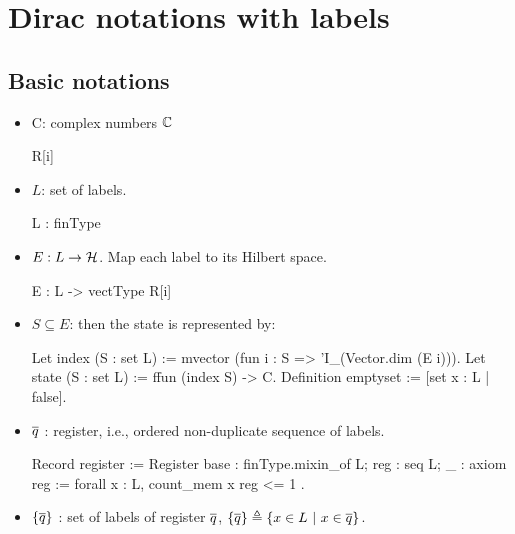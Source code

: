 \section{Dirac notations with labels}

    \subsection{Basic notations}
    \begin{itemize}
        \item C: complex numbers ${\mathbb{C}}$
        \begin{coq}
        R[i]
        \end{coq}
        \vspace{-.7cm}
        \item $L$: set of labels. 
        \begin{coq}
        L : finType
        \end{coq}
        \vspace{-.7cm}
        \item $E : L \rightarrow {\mathcal{H}}$. Map each label to its Hilbert space.
        \begin{coq}
        E : L -> vectType R[i]
        \end{coq}
        \vspace{-.7cm}
        \item $S\subseteq E$: then the state is represented by: 
        \begin{coq}
        Let index (S : {set L}) := mvector (fun i : S => 'I\_(Vector.dim (E i))).
        Let state (S : {set L}) := {ffun (index S) -> C}.
        Definition emptyset := [set x : L | false].
        \end{coq}
        \vspace{-.7cm}
        \item ${\overline{q}}$ : register, i.e., ordered non-duplicate sequence of labels.
        \begin{coq}
        Record register := Register {
            base : finType.mixin_of L;
            reg : seq L;
            _ : axiom reg := forall x : L, count_mem x reg <= 1
        }.
        \end{coq}
        \vspace{-.7cm}
        \item $\{{\overline{q}}\}$ : set of labels of register ${\overline{q}}$, $\{{\overline{q}}\}\triangleq\{x\in L \ |\ x\in {\overline{q}}\}$.
        

\end{itemize}
